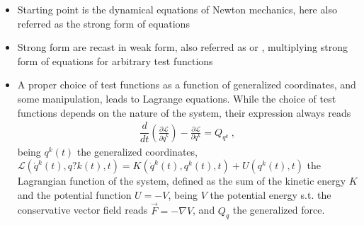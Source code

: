 \documentclass[letterpaper,10pt,english]{jupyterBook}
\begin{document}
\begin{itemize}
\item {} 
\sphinxAtStartPar
{} Starting point is the dynamical equations of Newton mechanics, here also referred as the strong form of equations

\item {} 
\sphinxAtStartPar
{} Strong form are recast in weak form, also referred as  or , multiplying strong form of equations for arbitrary test functions

\item {} 
\sphinxAtStartPar
{} A proper choice of test functions as a function of generalized coordinates, and some manipulation, leads to Lagrange equations. While the choice of test functions depends on the nature of the system, their expression always reads
\begin{equation}\label{equation:ch/lagrange:eq:lagrange-eq}
\begin{split}\dfrac{d}{dt}\left( \frac{\partial \mathscr{L}}{\partial \dot{q}^k} \right) - \frac{\partial \mathscr{L}}{\partial q^k} = Q_{q^k} \ ,\end{split}
\end{equation}
\sphinxAtStartPar
being \(q^k(t)\) the generalized coordinates, \(\mathscr{L}\left(\dot{q}^k(t), q?k(t), t \right) = K\left(\dot{q}^k(t), q^k(t), t\right) + U(q^k(t), t)\) the Lagrangian function of the system, defined as the sum of the kinetic energy \(K\) and the potential function \(U = - V\), being \(V\) the potential energy \sphinxhyphen{} s.t. the conservative vector field reads \(\vec{F} = - \nabla V\), and \(Q_q\) the generalized force.


\end{itemize}
\end{document}
